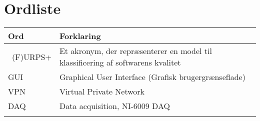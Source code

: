 \chapter{Ordliste}

\begin{longtabu} to 
    Ord &    Forklaring\\
    \toprule \
   (F)URPS+ &    Et akronym, der repræsenterer en model til klassificering af softwarens kvalitet\\
    GUI		&	Graphical User Interface (Grafisk brugergrænseflade)\\
    VPN		&	Virtual Private Network \\
    DAQ		&	Data acquisition, NI-6009 DAQ \\
 
\label{forkort}
\end{longtabu}